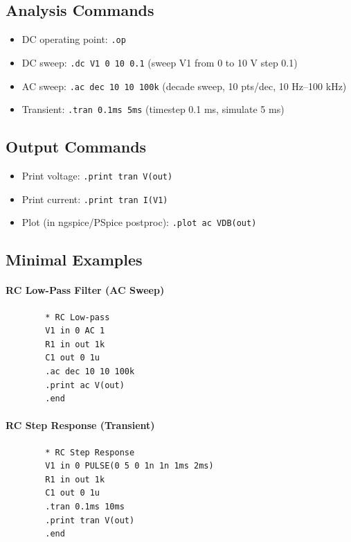 \documentclass[12pt]{article}
\begin{document}
	\subsection*{Analysis Commands}
	\begin{itemize}
		\item DC operating point: \verb|.op|
		\item DC sweep: \verb|.dc V1 0 10 0.1| \quad (sweep V1 from 0 to 10 V step 0.1)
		\item AC sweep: \verb|.ac dec 10 10 100k| \quad (decade sweep, 10 pts/dec, 10 Hz–100 kHz)
		\item Transient: \verb|.tran 0.1ms 5ms| \quad (timestep 0.1 ms, simulate 5 ms)
	\end{itemize}
	
	\subsection*{Output Commands}
	\begin{itemize}
		\item Print voltage: \verb|.print tran V(out)|
		\item Print current: \verb|.print tran I(V1)|
		\item Plot (in ngspice/PSpice postproc): \verb|.plot ac VDB(out)|
	\end{itemize}
	
	\subsection*{Minimal Examples}
	\paragraph{RC Low-Pass Filter (AC Sweep)}
	\begin{verbatim}
		* RC Low-pass
		V1 in 0 AC 1
		R1 in out 1k
		C1 out 0 1u
		.ac dec 10 10 100k
		.print ac V(out)
		.end
	\end{verbatim}
	
	\paragraph{RC Step Response (Transient)}
	\begin{verbatim}
		* RC Step Response
		V1 in 0 PULSE(0 5 0 1n 1n 1ms 2ms)
		R1 in out 1k
		C1 out 0 1u
		.tran 0.1ms 10ms
		.print tran V(out)
		.end
	\end{verbatim}
	
\end{document}
